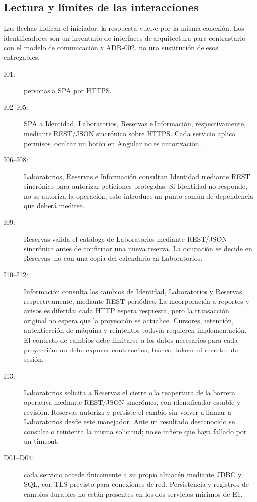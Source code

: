 \subsection{Lectura y límites de las interacciones}

Las flechas indican el iniciador; la respuesta vuelve por la misma conexión.
Los identificadores son un inventario de interfaces de arquitectura para
contrastarlo con el modelo de comunicación y ADR-002, no una sustitución de
esos entregables.

\begin{description}
  \item[I01:] personas a SPA por HTTPS.
  \item[I02--I05:] SPA a Identidad, Laboratorios, Reservas e Información,
  respectivamente, mediante REST/JSON sincrónico sobre HTTPS. Cada servicio
  aplica permisos; ocultar un botón en Angular no es autorización.
  \item[I06--I08:] Laboratorios, Reservas e Información consultan Identidad
  mediante REST sincrónico para autorizar peticiones protegidas. Si Identidad
  no responde, no se autoriza la operación; esto introduce un punto común de
  dependencia que deberá medirse.
  \item[I09:] Reservas valida el catálogo de Laboratorios mediante REST/JSON
  sincrónico antes de confirmar una nueva reserva. La ocupación se decide en
  Reservas, no con una copia del calendario en Laboratorios.
  \item[I10--I12:] Información consulta los cambios de Identidad, Laboratorios
  y Reservas, respectivamente, mediante REST periódico. La incorporación a
  reportes y avisos es diferida: cada HTTP espera respuesta, pero la transacción
  original no espera que la proyección se actualice. Cursores, retención,
  autenticación de máquina y reintentos todavía requieren implementación.
  El contrato de cambios debe limitarse a los datos necesarios para cada
  proyección: no debe exponer contraseñas, hashes, tokens ni secretos de sesión.
  \item[I13:] Laboratorios solicita a Reservas el cierre o la reapertura de
  la barrera operativa mediante REST/JSON sincrónico, con identificador estable
  y revisión. Reservas autoriza y persiste el cambio sin volver a llamar a
  Laboratorios desde este manejador. Ante un resultado desconocido se consulta
  o reintenta la misma solicitud; no se infiere que haya fallado por un timeout.
  \item[D01--D04:] cada servicio accede únicamente a su propio almacén mediante
  JDBC y SQL, con TLS previsto para conexiones de red. Persistencia y registros
  de cambios durables no están presentes en los dos servicios mínimos de E1.
\end{description}

